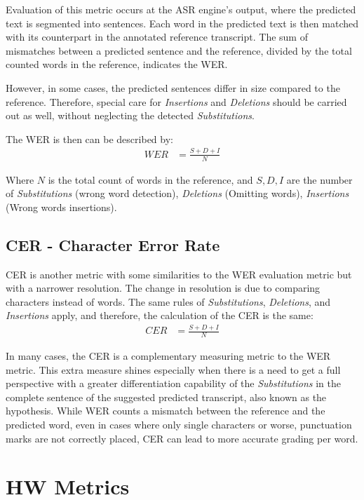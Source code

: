Evaluation of this metric occurs at the ASR engine's output, 
where the predicted text is segmented into sentences. 
Each word in the predicted
text is then matched with its counterpart in the 
annotated reference transcript. 
The sum of mismatches between a predicted sentence and the reference, 
divided by the total counted words in the reference, indicates the WER.

However, in some cases, the predicted sentences differ in size compared
to the reference. Therefore, special care for \emph{Insertions}
and \emph{Deletions} should be carried out as well, without neglecting
the detected \emph{Substitutions}.

The WER is then can be described by:
\begin{align}
    WER & = \frac{S + D + I}{N}
\end{align}

Where \(N\) is the total count of words in the reference,
and \(S,D,I\) are the number of \emph{Substitutions} (wrong word detection),
\emph{Deletions} (Omitting words), \emph{Insertions} (Wrong words insertions).

\subsection{CER - Character Error Rate}
CER is another metric with some similarities to the 
WER evaluation metric but with a narrower resolution.
The change in resolution is due to comparing characters instead of words.
The same rules of \emph{Substitutions}, \emph{Deletions}, and \emph{Insertions}
apply, and therefore, the calculation of the CER is the same:
\begin{align}
    CER & = \frac{S + D + I}{N}
\end{align}

In many cases, the CER\cite{_isword} is a complementary 
measuring metric to the WER
metric.
This extra measure shines especially 
when there is a need to get a full perspective 
with a greater differentiation capability of the 
\emph{Substitutions} in the complete sentence 
of the suggested predicted transcript,
 also known as the hypothesis. 
While WER counts a mismatch between the reference and the predicted 
word, even in cases where only single characters or worse, 
punctuation marks are not correctly placed, CER can lead to 
more accurate grading per word.

\section{HW Metrics}
